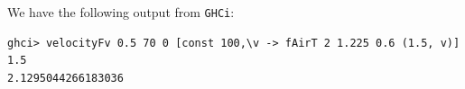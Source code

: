 We have the following output from \verb|GHCi|:

\begin{lstlisting}
ghci> velocityFv 0.5 70 0 [const 100,\v -> fAirT 2 1.225 0.6 (1.5, v)] 1.5
2.1295044266183036
\end{lstlisting}

